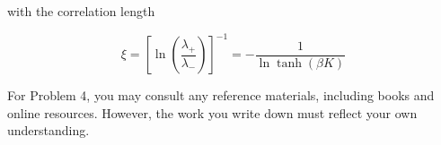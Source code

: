 \documentclass[12pt]{article}
\begin{document}
with the correlation length


\begin{equation*}
\xi=\left[\ln \left(\frac{\lambda_{+}}{\lambda_{-}}\right)\right]^{-1}=-\frac{1}{\ln \tanh (\beta K)} \tag{8}
\end{equation*}


For Problem 4, you may consult any reference materials, including books and online resources. However, the work you write down must reflect your own understanding.
\end{document}
